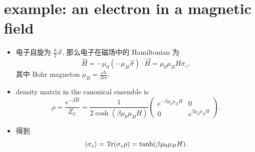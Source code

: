 \section{example: an electron in a magnetic field}
\begin{itemize}
	\item 电子自旋为 $\frac{\hbar}{2} \vec{\sigma}$, 那么电子在磁场中的 Hamiltonian 为
	\begin{equation} \label{5.3.1}
		\hat{H} = - \mu_0 (- \mu_B \vec{\sigma}) \cdot \vec{H} = \mu_0 \mu_B H \sigma_z,
	\end{equation}
	其中 Bohr magneton $\mu_B = \frac{e \hbar}{2 m}$.
	
	\item density matrix in the canonical ensemble is
	\begin{equation}
		\rho = \frac{e^{- \beta \hat{H}}}{Z_\text{C}} = \frac{1}{2 \cosh(\beta \mu_0 \mu_B H)} \begin{pmatrix}
			e^{- \beta \mu_0 \mu_B H} & 0 \\
			0 & e^{\beta \mu_0 \mu_B H}
		\end{pmatrix}.
	\end{equation}
	
	\item 得到
	\begin{equation}
		\braket{\sigma_z} = \mathrm{Tr}(\sigma_z \rho) = \tanh(\beta \mu_0 \mu_B H).
	\end{equation}
\end{itemize}

